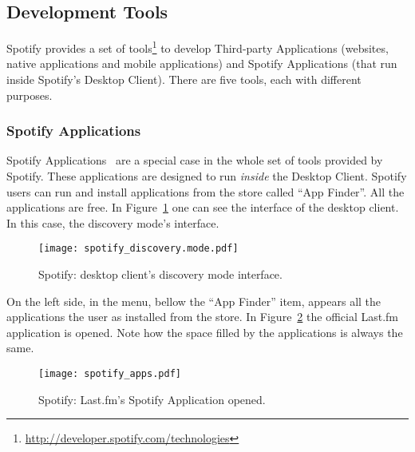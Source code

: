 



    \subsection{Development Tools} %
    \label{sub:devtools}
    
      Spotify provides a set of tools\footnote{\url{http://developer.spotify.com/technologies}} to develop Third-party Applications (websites, native applications and mobile applications) and Spotify Applications (that run inside Spotify's Desktop Client).
      There are five tools, each with different purposes.

      \subsubsection{Spotify Applications} %
      \label{ssub:spotify_apps}
        Spotify Applications~\cite{spotifyapps} are a special case in the whole set of tools provided by Spotify.
        These applications are designed to run \emph{inside} the Desktop Client.
        Spotify users can run and install applications from the store called ``App Finder''.
        All the applications are free.
        In Figure~\ref{fig:spotify_apps} one can see the interface of the desktop client.
        In this case, the discovery mode's interface.
        \begin{figure}
          \begin{center}
            \texttt{[image: spotify\_discovery.mode.pdf]}
          \end{center}
          \caption{Spotify: desktop client's discovery mode interface.}
          \label{fig:spotify_apps}
        \end{figure}
        On the left side, in the menu, bellow the ``App Finder'' item, appears all the applications the user as installed from the store.
        In Figure~\ref{fig:spotify_apps2} the official Last.fm application is opened.
        Note how the space filled by the applications is always the same.

        \begin{figure}
          \begin{center}
            \texttt{[image: spotify\_apps.pdf]}
          \end{center}
          \caption{Spotify: Last.fm's Spotify Application opened.}
          \label{fig:spotify_apps2}
        \end{figure}

